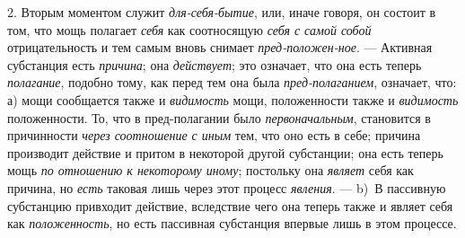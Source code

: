\documentclass[twoside]{article}
\begin{document}
{2. Вторым моментом служит {\em для-себя-бытие}, или, иначе говоря, он 
состоит в том, что мощь полагает {\em себя} как соотносящую {\em себя с 
самой собой} отрицательность и тем самым вновь снимает 
{\em пред-положен-ное}. — Активная субстанция есть {\em причина}; она 
{\em действует}; это означает, что она есть теперь {\em полагание}, подобно 
тому, как перед тем она была {\em пред-полаганием}, означает, что: а) мощи 
сообщается также и {\em видимость} мощи, положенности также и {\em видимость} 
положенности. То, что в пред-полагании было {\em первоначальным}, становится 
в причинности {\em через соотношение с иным} тем, что оно есть в себе; 
причина производит действие и притом в некоторой другой субстанции; она есть 
теперь мощь {\em по отношению к некоторому иному}; постольку она {\em являет} 
себя как причина, но {\em есть} таковая лишь через этот процесс {\em явления}. 
— b)~В пассивную субстанцию привходит действие, вследствие чего она теперь 
также и являет себя как {\em положенность}, но есть пассивная субстанция 
впервые лишь в этом процессе.

}
\end{document}
